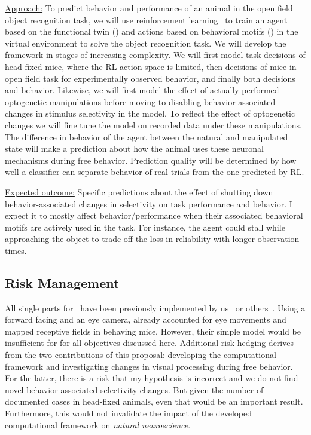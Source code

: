 \documentclass[COG,11pt]{ercgrant}
\begin{document}
\underline{Approach:} 
To predict behavior and performance of an animal in the open field object recognition task, we will use reinforcement learning~\parencite[RL,][]{Cobbe2021-op} to train an agent based on the functional twin () and actions based on behavioral motifs () in the virtual environment to solve the object recognition task.
We will develop the framework in stages of increasing complexity.
We will first model task decisions of head-fixed mice, where the RL-action space is limited, 
then decisions of mice in open field task for experimentally observed behavior, and finally both decisions and behavior. 
Likewise, we will first model the effect of actually performed optogenetic manipulations before moving to disabling behavior-associated changes in stimulus selectivity in the model. 
To reflect the effect of optogenetic changes we will fine tune the model on recorded data under these manipulations. 
The difference in behavior of the agent between the natural and manipulated state will make a prediction about how the animal uses these neuronal mechanisms during free behavior.
Prediction quality will be determined by how well a classifier can separate behavior of real trials from the one predicted by RL. 


\underline{Expected outcome:} 
Specific predictions about the effect of shutting down  behavior-associated changes in selectivity on task performance and behavior. 
I expect it to mostly affect behavior/performance when their associated behavioral motifs are actively used in the task.
For instance, the agent could stall while approaching the object to trade off the loss in reliability with longer observation times. 


\subsection{Risk Management}
All single parts for~ have been previously  implemented by us~\parencite{Sinz2018-sk, Bashiri2021-or} or others~\parencite{Parker2022-ac,Holmgren2021-jv}. 
Using a forward facing and an eye camera, \textcite{Parker2022-ac} already accounted for eye movements and mapped receptive fields in behaving mice. 
However, their simple model would be insufficient for  for all objectives discussed here.
Additional risk hedging derives from the two contributions of this proposal: developing the computational framework and investigating changes in visual processing during free behavior.
For the latter, there is a risk that my hypothesis is incorrect and we do not find novel behavior-associated selectivity-changes. 
But given the number of documented cases in head-fixed animals, even that would be an important result. 
Furthermore, this would not invalidate the impact of the developed computational framework on \textit{natural neuroscience}. 
\end{document}

